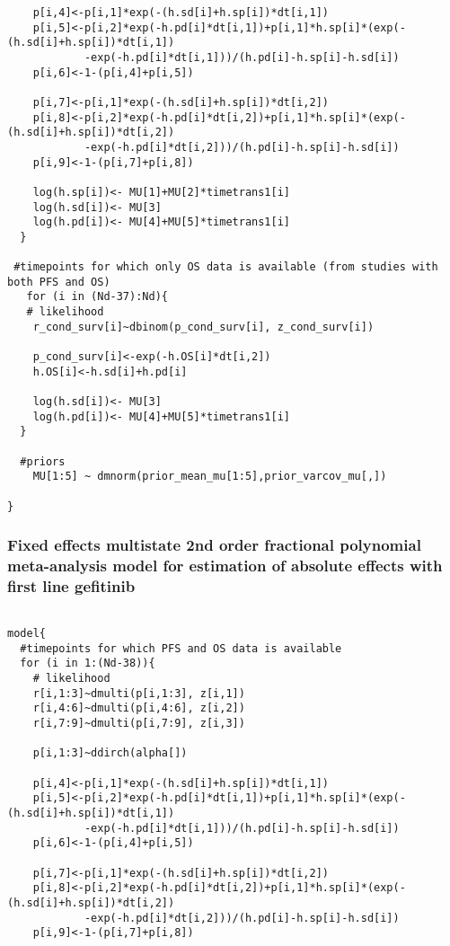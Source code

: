 \documentclass[11pt,final,fleqn]{article}\usepackage[]{graphicx}\usepackage[]{color}
\theoremstyle{plain}
\begin{document}
\begin{appendices}
\begin{verbatim}
    p[i,4]<-p[i,1]*exp(-(h.sd[i]+h.sp[i])*dt[i,1])
    p[i,5]<-p[i,2]*exp(-h.pd[i]*dt[i,1])+p[i,1]*h.sp[i]*(exp(-(h.sd[i]+h.sp[i])*dt[i,1])
    		-exp(-h.pd[i]*dt[i,1]))/(h.pd[i]-h.sp[i]-h.sd[i])
    p[i,6]<-1-(p[i,4]+p[i,5])
    
    p[i,7]<-p[i,1]*exp(-(h.sd[i]+h.sp[i])*dt[i,2])
    p[i,8]<-p[i,2]*exp(-h.pd[i]*dt[i,2])+p[i,1]*h.sp[i]*(exp(-(h.sd[i]+h.sp[i])*dt[i,2])
    		-exp(-h.pd[i]*dt[i,2]))/(h.pd[i]-h.sp[i]-h.sd[i])
    p[i,9]<-1-(p[i,7]+p[i,8])
    
    log(h.sp[i])<- MU[1]+MU[2]*timetrans1[i] 
    log(h.sd[i])<- MU[3] 
    log(h.pd[i])<- MU[4]+MU[5]*timetrans1[i]
  }
  
 #timepoints for which only OS data is available (from studies with both PFS and OS)
   for (i in (Nd-37):Nd){
   # likelihood
    r_cond_surv[i]~dbinom(p_cond_surv[i], z_cond_surv[i]) 
    
    p_cond_surv[i]<-exp(-h.OS[i]*dt[i,2])
    h.OS[i]<-h.sd[i]+h.pd[i]
    
    log(h.sd[i])<- MU[3]
    log(h.pd[i])<- MU[4]+MU[5]*timetrans1[i]
  }
    
  #priors
    MU[1:5] ~ dmnorm(prior_mean_mu[1:5],prior_varcov_mu[,]) 
  
}

\end{verbatim}

\subsubsection{Fixed effects multistate 2nd order fractional polynomial meta-analysis model for estimation of absolute effects with first line gefitinib}

\begin{verbatim} 

model{
  #timepoints for which PFS and OS data is available
  for (i in 1:(Nd-38)){
    # likelihood
    r[i,1:3]~dmulti(p[i,1:3], z[i,1]) 
    r[i,4:6]~dmulti(p[i,4:6], z[i,2]) 
    r[i,7:9]~dmulti(p[i,7:9], z[i,3]) 
    
    p[i,1:3]~ddirch(alpha[])
    
    p[i,4]<-p[i,1]*exp(-(h.sd[i]+h.sp[i])*dt[i,1])
    p[i,5]<-p[i,2]*exp(-h.pd[i]*dt[i,1])+p[i,1]*h.sp[i]*(exp(-(h.sd[i]+h.sp[i])*dt[i,1])
    		-exp(-h.pd[i]*dt[i,1]))/(h.pd[i]-h.sp[i]-h.sd[i])
    p[i,6]<-1-(p[i,4]+p[i,5])
    
    p[i,7]<-p[i,1]*exp(-(h.sd[i]+h.sp[i])*dt[i,2])
    p[i,8]<-p[i,2]*exp(-h.pd[i]*dt[i,2])+p[i,1]*h.sp[i]*(exp(-(h.sd[i]+h.sp[i])*dt[i,2])
    		-exp(-h.pd[i]*dt[i,2]))/(h.pd[i]-h.sp[i]-h.sd[i])
    p[i,9]<-1-(p[i,7]+p[i,8])
    

\end{verbatim}
\end{appendices}
\end{document}
